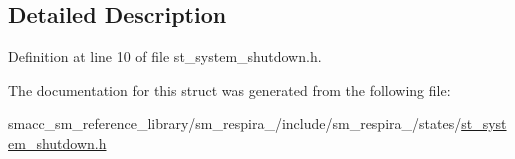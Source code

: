 \subsection{Detailed Description}


Definition at line 10 of file st\+\_\+system\+\_\+shutdown.\+h.



The documentation for this struct was generated from the following file\+:\begin{DoxyCompactItemize}
\item 
smacc\+\_\+sm\+\_\+reference\+\_\+library/sm\+\_\+respira\+\_/include/sm\+\_\+respira\+\_/states/\hyperlink{st__system__shutdown_8h}{st\+\_\+system\+\_\+shutdown.\+h}\end{DoxyCompactItemize}
